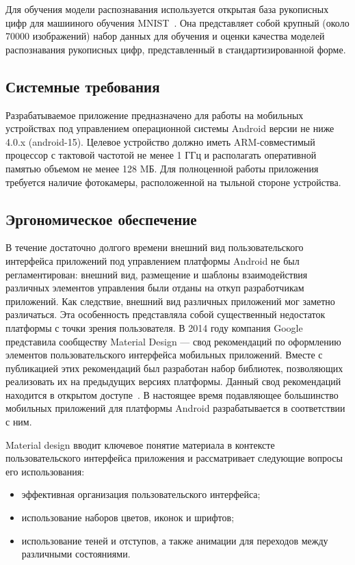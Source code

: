 Для обучения модели распознавания используется открытая база рукописных
цифр для машииного обучения MNIST~\cite{mnist}.
Она представляет собой крупный (около 70000 изображений) набор данных
для обучения и оценки качества моделей распознавания рукописных цифр,
представленный в стандартизированной форме.

\subsection{Системные требования}

Разрабатываемое приложение предназначено для работы на мобильных устройствах
под управлением операционной системы Android версии не ниже 4.0.x (android-15).
Целевое устройство должно иметь ARM-совместимый процессор с тактовой частотой не менее
1 ГГц и располагать оперативной памятью объемом не менее 128 MБ.
Для полноценной работы приложения требуется наличие фотокамеры,
расположенной на тыльной стороне устройства.

\subsection{Эргономическое обеспечение}

В течение достаточно долгого времени внешний вид пользовательского интерфейса
приложений под управлением платформы Android не был регламентирован:
внешний вид, размещение и шаблоны взаимодействия различных элементов управления
были отданы на откуп разработчикам приложений.
Как следствие, внешний вид различных приложений мог заметно различаться.
Эта особенность представляла собой существенный недостаток платформы
с точки зрения пользователя.
В 2014 году компания Google представила сообществу Material Design ---
свод рекомендаций по оформлению элементов пользовательского интерфейса
мобильных приложений. Вместе с публикацией этих рекомендаций был
разработан набор библиотек, позволяющих реализовать их на предыдущих версиях платформы.
Данный свод рекомендаций находится в открытом доступе~\cite{material_design}.
В настоящее время подавляющее большинство мобильных приложений для
платформы Android разрабатывается в соответствии с ним.

Material design вводит ключевое понятие материала в контексте
пользовательского интерфейса приложения и рассматривает следующие
вопросы его использования:
\begin{itemize}
\item эффективная организация пользовательского интерфейса;
\item использование наборов цветов, иконок и шрифтов;
\item использование теней и отступов,
  а также анимации для переходов между различными состояниями.
\end{itemize}

